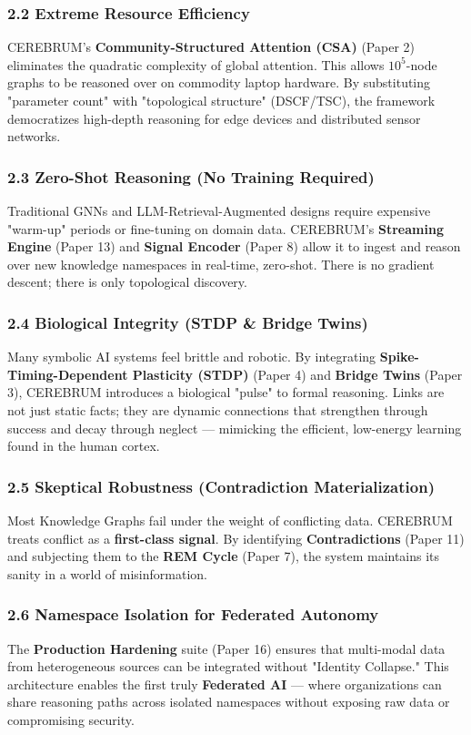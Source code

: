 \subsubsection*{2.2 Extreme Resource Efficiency}
CEREBRUM's \textbf{Community-Structured Attention (CSA)} (Paper 2) eliminates the quadratic complexity of global attention. This allows $10^5$-node graphs to be reasoned over on commodity laptop hardware. By substituting "parameter count" with "topological structure" (DSCF/TSC), the framework democratizes high-depth reasoning for edge devices and distributed sensor networks.

\subsubsection*{2.3 Zero-Shot Reasoning (No Training Required)}
Traditional GNNs and LLM-Retrieval-Augmented designs require expensive "warm-up" periods or fine-tuning on domain data. CEREBRUM's \textbf{Streaming Engine} (Paper 13) and \textbf{Signal Encoder} (Paper 8) allow it to ingest and reason over new knowledge namespaces in real-time, zero-shot. There is no gradient descent; there is only topological discovery.

\subsubsection*{2.4 Biological Integrity (STDP \& Bridge Twins)}
Many symbolic AI systems feel brittle and robotic. By integrating \textbf{Spike-Timing-Dependent Plasticity (STDP)} (Paper 4) and \textbf{Bridge Twins} (Paper 3), CEREBRUM introduces a biological "pulse" to formal reasoning. Links are not just static facts; they are dynamic connections that strengthen through success and decay through neglect --- mimicking the efficient, low-energy learning found in the human cortex.

\subsubsection*{2.5 Skeptical Robustness (Contradiction Materialization)}
Most Knowledge Graphs fail under the weight of conflicting data. CEREBRUM treats conflict as a \textbf{first-class signal}. By identifying \textbf{Contradictions} (Paper 11) and subjecting them to the \textbf{REM Cycle} (Paper 7), the system maintains its sanity in a world of misinformation.

\subsubsection*{2.6 Namespace Isolation for Federated Autonomy}
The \textbf{Production Hardening} suite (Paper 16) ensures that multi-modal data from heterogeneous sources can be integrated without "Identity Collapse." This architecture enables the first truly \textbf{Federated AI} --- where organizations can share reasoning paths across isolated namespaces without exposing raw data or compromising security.

